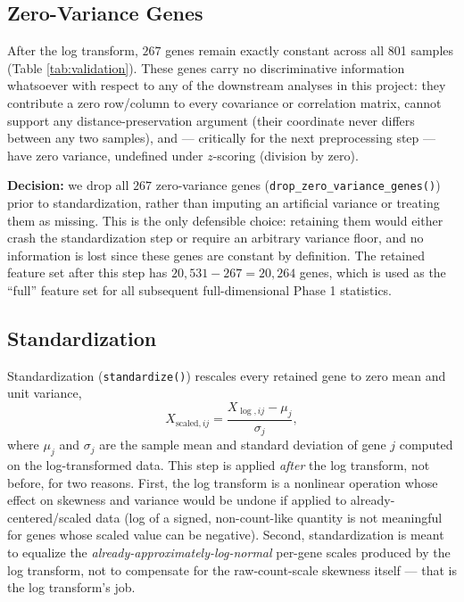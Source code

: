 \documentclass[11pt]{article}
\begin{document}
\subsection{Zero-Variance Genes}
\label{sec:zero-var}

After the log transform, $267$ genes remain exactly constant across all
801 samples (Table \ref{tab:validation}). These genes carry no
discriminative information whatsoever with respect to any of the
downstream analyses in this project: they contribute a zero row/column to
every covariance or correlation matrix, cannot support any
distance-preservation argument (their coordinate never differs between
any two samples), and --- critically for the next preprocessing step ---
have zero variance, undefined under $z$-scoring (division by zero).

\textbf{Decision:} we drop all $267$ zero-variance genes
(\texttt{drop\_zero\_variance\_genes()}) prior to standardization, rather
than imputing an artificial variance or treating them as missing. This is
the only defensible choice: retaining them would either crash the
standardization step or require an arbitrary variance floor, and no
information is lost since these genes are constant by definition. The
retained feature set after this step has $20{,}531 - 267 = 20{,}264$
genes, which is used as the ``full'' feature set for all subsequent
full-dimensional Phase 1 statistics.

\subsection{Standardization}
\label{sec:standardization}

Standardization (\texttt{standardize()}) rescales every retained gene to
zero mean and unit variance,
\[
  X_{\text{scaled}, ij} = \frac{X_{\log, ij} - \mu_j}{\sigma_j},
\]
where $\mu_j$ and $\sigma_j$ are the sample mean and standard deviation
of gene $j$ computed on the log-transformed data. This step is applied
\emph{after} the log transform, not before, for two reasons. First, the
log transform is a nonlinear operation whose effect on skewness and
variance would be undone if applied to already-centered/scaled data
(log of a signed, non-count-like quantity is not meaningful for genes
whose scaled value can be negative). Second, standardization is meant to
equalize the \emph{already-approximately-log-normal} per-gene scales
produced by the log transform, not to compensate for the raw-count-scale
skewness itself --- that is the log transform's job.
\end{document}
